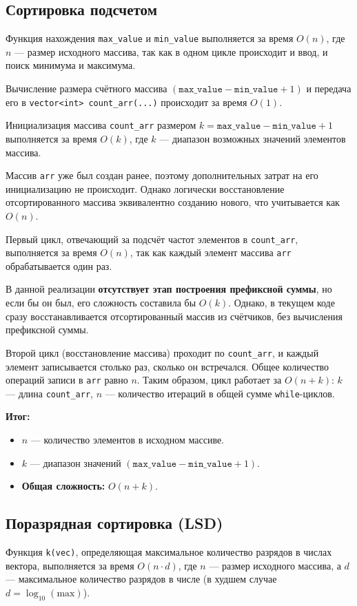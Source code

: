 \documentclass[otchet]{SCWorks}
\begin{document}
\subsection{Сортировка подсчетом}
Функция нахождения \texttt{max\_value} и \texttt{min\_value} выполняется за время $O(n)$, где $n$ — размер исходного массива, так как в одном цикле происходит и ввод, и поиск минимума и максимума.

Вычисление размера счётного массива $(\texttt{max\_value} - \texttt{min\_value} + 1)$ и передача его в \texttt{vector<int> count\_arr(...)} происходит за время $O(1)$.

Инициализация массива \texttt{count\_arr} размером $k = \texttt{max\_value} - \texttt{min\_value} + 1$ выполняется за время $O(k)$, где $k$ — диапазон возможных значений элементов массива.

Массив \texttt{arr} уже был создан ранее, поэтому дополнительных затрат на его инициализацию не происходит. Однако логически восстановление отсортированного массива эквивалентно созданию нового, что учитывается как $O(n)$.

Первый цикл, отвечающий за подсчёт частот элементов в \texttt{count\_arr}, выполняется за время $O(n)$, так как каждый элемент массива \texttt{arr} обрабатывается один раз.

В данной реализации \textbf{отсутствует этап построения префиксной суммы}, но если бы он был, его сложность составила бы $O(k)$. Однако, в текущем коде сразу восстанавливается отсортированный массив из счётчиков, без вычисления префиксной суммы.

Второй цикл (восстановление массива) проходит по \texttt{count\_arr}, и каждый элемент записывается столько раз, сколько он встречался. Общее количество операций записи в \texttt{arr} равно $n$. Таким образом, цикл работает за $O(n + k)$: $k$ — длина \texttt{count\_arr}, $n$ — количество итераций в общей сумме \texttt{while}-циклов.

\textbf{Итог:}
\begin{itemize}
    \item $n$ — количество элементов в исходном массиве.
    \item $k$ — диапазон значений $(\texttt{max\_value} - \texttt{min\_value} + 1)$.
    \item \textbf{Общая сложность:} $O(n + k)$.
\end{itemize}

\subsection{Поразрядная сортировка (LSD)}
Функция \texttt{k(vec)}, определяющая максимальное количество разрядов в числах вектора, выполняется за время $O(n \cdot d)$, где $n$ — размер исходного массива, а $d$ — максимальное количество разрядов в числе (в худшем случае $d = \log_{10}(\text{max})$).
\end{document}
